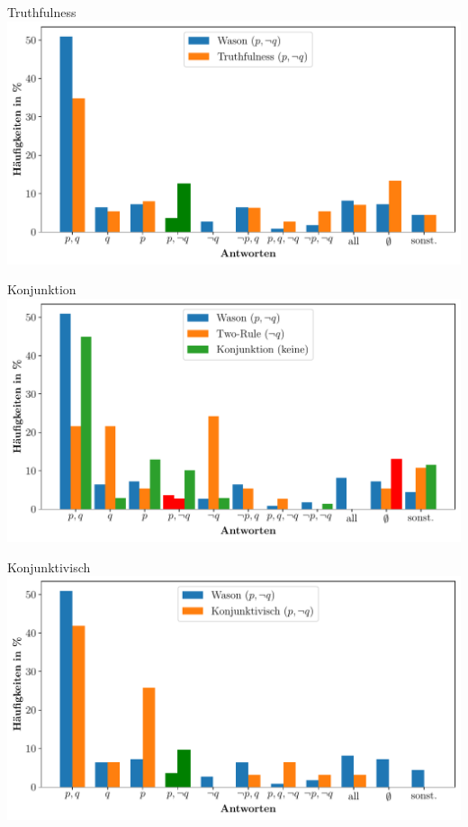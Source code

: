 \begin{frame}{Truthfulness {\scriptsize \cite[S.~109]{stenningHumanReasoningCognitive2008}}}
    \includegraphics[width=\textwidth]{../plot/results_truthfulness.pdf}
\end{frame}


\begin{frame}{Konjunktion {\scriptsize \cite[S.~109]{stenningHumanReasoningCognitive2008}}}
    \includegraphics[width=\textwidth]{../plot/results_conjunction.pdf}
\end{frame}


\begin{frame}{Konjunktivisch {\scriptsize \cite[S.~109]{stenningHumanReasoningCognitive2008}}}
    \includegraphics[width=\textwidth]{../plot/results_subjunctive.pdf}
\end{frame}
